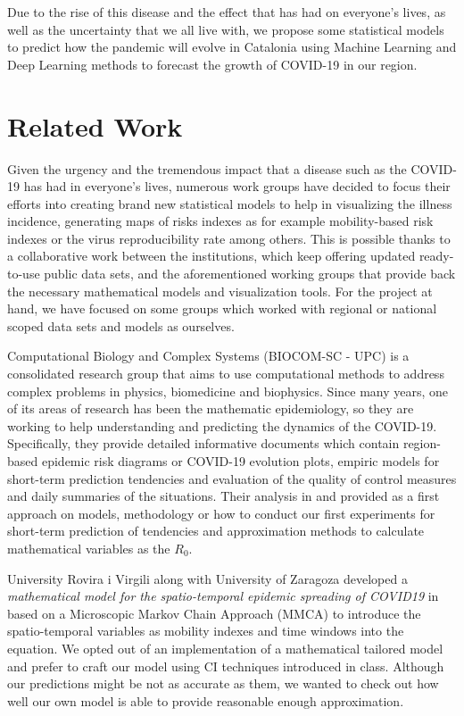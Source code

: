 \documentclass[anon]{CI}
\begin{document}
Due to the rise of this disease and the effect that has had on everyone’s lives, as well as the uncertainty that we all live with, we propose some statistical models to predict how the pandemic will evolve in Catalonia using Machine Learning and Deep Learning methods to forecast the growth of COVID-19 in our region.

\section{Related Work}

Given the urgency and the tremendous impact that a disease such as the COVID-19 has had in everyone's lives, numerous work groups have decided to focus their efforts into creating brand new statistical models to help in visualizing the illness incidence, generating maps of risks indexes as for example mobility-based risk indexes or the virus reproducibility rate among others. This is possible thanks to a collaborative work between the institutions, which keep offering updated ready-to-use public data sets, and the aforementioned working groups that provide back the necessary mathematical models and visualization tools. For the project at hand, we have focused on some groups which worked with regional or national scoped data sets and models as ourselves.

Computational Biology and Complex Systems (BIOCOM-SC - UPC) is a consolidated research group that aims to use computational methods to address complex problems in physics, biomedicine and biophysics. Since many years, one of its areas of research has been the mathematic epidemiology, so they are working to help understanding and predicting the dynamics of the COVID-19. Specifically, they provide detailed informative documents which contain region-based epidemic risk diagrams or COVID-19 evolution plots, empiric models for short-term prediction tendencies and evaluation of the quality of control measures and daily summaries of the situations. Their analysis in \cite{PredictionMethods} and \cite{Catala_Cardona_Prats_Alonso_Alvarez-Lacalle_Marchena_Conesa_Lopez_2020} provided as a first approach on models, methodology or how to conduct our first experiments for short-term prediction of tendencies and approximation methods to calculate mathematical variables as the $R_{0}$.

University Rovira i Virgili along with University of Zaragoza developed a \textit{mathematical model for the spatio-temporal epidemic spreading of COVID19} in \cite{Arenas2020.03.21.20040022} based on a Microscopic Markov Chain Approach (MMCA) to introduce the spatio-temporal variables as mobility indexes and time windows into the equation. We opted out of an implementation of a mathematical tailored model and prefer to craft our model using CI techniques introduced in class. Although our predictions might be not as accurate as them, we wanted to check out how well our own model is able to provide reasonable enough approximation.
\end{document}
